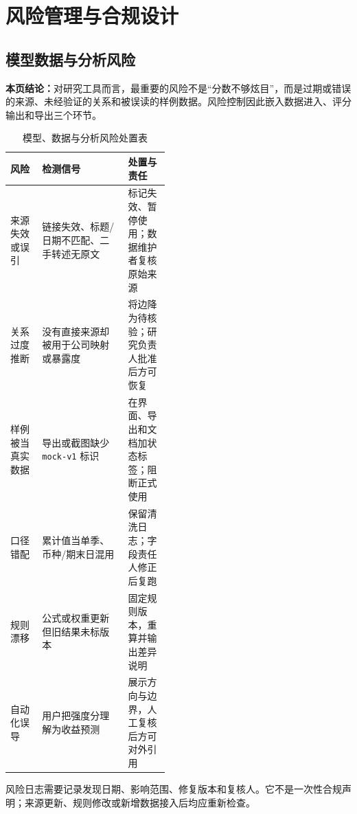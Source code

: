 \clearpage
\section{风险管理与合规设计}
\subsection*{模型数据与分析风险}\label{page:46}
\fi

\textbf{本页结论：}对研究工具而言，最重要的风险不是“分数不够炫目”，而是过期或错误的来源、未经验证的关系和被误读的样例数据。风险控制因此嵌入数据进入、评分输出和导出三个环节。

\begin{table}[htbp]
\centering
\caption{模型、数据与分析风险处置表}
\label{tab:wty-risk-register}
\small
\begin{tabularx}{\linewidth}{p{0.20\linewidth}X p{0.26\linewidth}}
\toprule
风险 & 检测信号 & 处置与责任 \\
\midrule
来源失效或误引 & 链接失效、标题/日期不匹配、二手转述无原文 & 标记失效、暂停使用；数据维护者复核原始来源 \\
关系过度推断 & 没有直接来源却被用于公司映射或暴露度 & 将边降为待核验；研究负责人批准后方可恢复 \\
样例被当真实数据 & 导出或截图缺少 \texttt{mock-v1} 标识 & 在界面、导出和文档加状态标签；阻断正式使用 \\
口径错配 & 累计值当单季、币种/期末日混用 & 保留清洗日志；字段责任人修正后复跑 \\
规则漂移 & 公式或权重更新但旧结果未标版本 & 固定规则版本，重算并输出差异说明 \\
自动化误导 & 用户把强度分理解为收益预测 & 展示方向与边界，人工复核后方可对外引用 \\
\bottomrule
\end{tabularx}
\end{table}

风险日志需要记录发现日期、影响范围、修复版本和复核人。它不是一次性合规声明；来源更新、规则修改或新增数据接入后均应重新检查。
